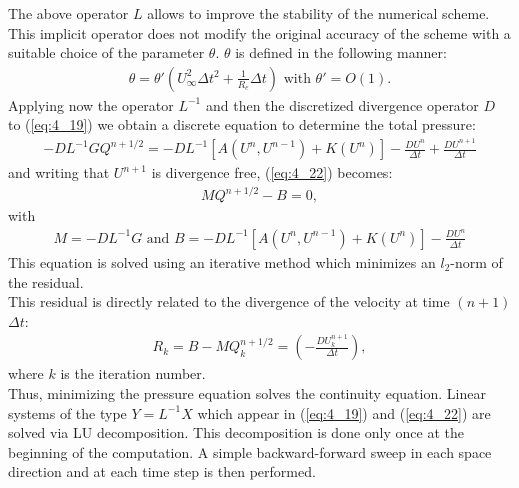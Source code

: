\documentclass[11pt]{report}
\newcommand{\refn}[1]{(\ref{#1})}
\newcommand{\refx}[1]{\refn{eq:#1}}
\newcommand{\dsp}{\displaystyle}
\newcommand{\NI}{\noindent}
\begin{document}
	\NI The above operator $L$ allows to improve the stability of the numerical scheme. This implicit operator does not modify the original accuracy of the scheme with a suitable choice of the parameter $\theta$. $\theta$ is defined in the following manner:
	\begin{eqnarray*}
		\theta = \theta'\left(U_\infty^2\Delta t^2 + \frac{1}{R_e}\Delta t\right) \text{ with } \theta' = O(1).
	\end{eqnarray*}
	Applying now the operator $\dsp L^{-1}$ and then the discretized divergence operator $D$ to \refx{4_19} we obtain a discrete equation to determine the total pressure:
	\begin{eqnarray}
		-DL^{-1}GQ^{n+1/2} = - DL^{-1}[A(U^n, U^{n-1})+K(U^n)] - \frac{DU^n}{\Delta t} + \frac{DU^{n+1}}{\Delta t}\label{eq:4_22}
	\end{eqnarray}
	and writing that $U^{n+1}$ is divergence free, \refx{4_22} becomes:
	\begin{eqnarray}
		MQ^{n+1/2} - B = 0,\label{eq:4_23}
	\end{eqnarray}
	with
	\begin{eqnarray*}
		M=-DL^{-1}G \text{ and } B=-DL^{-1}[A(U^n, U^{n-1})+K(U^n)] - \frac{DU^n}{\Delta t}
	\end{eqnarray*}
	This equation is solved using an iterative method which minimizes an $l_2$-norm of the residual.\\
	This residual is directly related to the divergence of the velocity at time $(n+1)$ $\Delta t$:
	\begin{eqnarray*}
		R_k = B-MQ_k^{n+1/2} = \left(-\frac{DU_k^{n+1}}{\Delta t}\right),
	\end{eqnarray*}
	where $k$ is the iteration number.\\
	Thus, minimizing the pressure equation solves the continuity equation. Linear systems of the type $Y=L^{-1}X$ which appear in \refx{4_19} and \refx{4_22} are solved via LU decomposition. This decomposition is done only once at the beginning of the computation. A simple backward-forward sweep in each space direction and at each time step is then performed.
	
\end{document}
